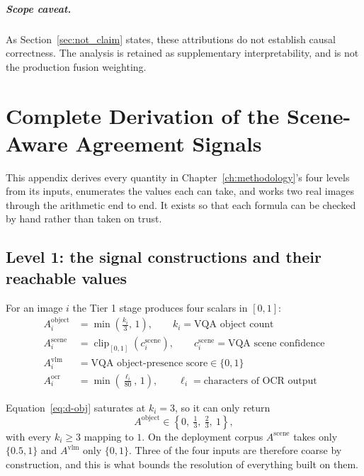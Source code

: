 \documentclass[12pt,a4paper]{report}
\begin{document}
\paragraph{Scope caveat.} As Section~\ref{sec:not_claim} states, these attributions do not establish causal correctness. The analysis is retained as supplementary interpretability, and is not the production fusion weighting.

\cleardoublepage
{}
\chapter{Complete Derivation of the Scene-Aware Agreement Signals}
\label{app:derivations}

This appendix derives every quantity in Chapter~\ref{ch:methodology}'s four levels from its inputs, enumerates the values each can take, and works two real images through the arithmetic end to end. It exists so that each formula can be checked by hand rather than taken on trust.

\section{Level 1: the signal constructions and their reachable values}

For an image $i$ the Tier 1 stage produces four scalars in $[0,1]$:
\begin{align}
A_i^{\text{object}} &= \min\!\left(\tfrac{k_i}{3},\, 1\right), \qquad k_i = \text{VQA object count} \label{eq:d-obj}\\
A_i^{\text{scene}}  &= \operatorname{clip}_{[0,1]}\!\left(c_i^{\text{scene}}\right), \qquad c_i^{\text{scene}} = \text{VQA scene confidence} \label{eq:d-scene}\\
A_i^{\text{vlm}}    &= \text{VQA object-presence score} \in \{0,1\} \label{eq:d-vlm}\\
A_i^{\text{ocr}}    &= \min\!\left(\tfrac{\ell_i}{80},\, 1\right), \qquad \ell_i = \text{characters of OCR output} \label{eq:d-ocr}
\end{align}

Equation~\ref{eq:d-obj} saturates at $k_i=3$, so it can only return
\[
A^{\text{object}} \in \left\{0,\ \tfrac13,\ \tfrac23,\ 1\right\},
\]
with every $k_i \ge 3$ mapping to $1$. On the deployment corpus $A^{\text{scene}}$ takes only $\{0.5, 1\}$ and $A^{\text{vlm}}$ only $\{0,1\}$. Three of the four inputs are therefore coarse by construction, and this is what bounds the resolution of everything built on them.
\end{document}
